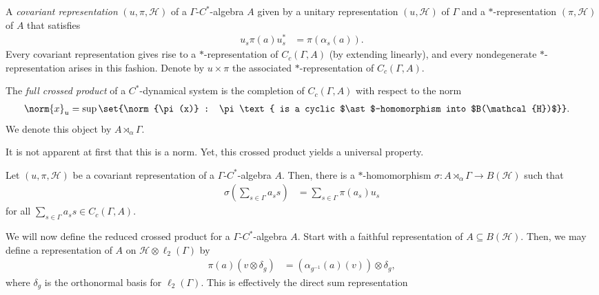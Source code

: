 \documentclass[10pt]{mypackage}
\begin{document}
A \textit{covariant representation} $\left( u,\pi,\mathcal{H} \right)$ of a $\Gamma$-$C^{\ast}$-algebra $A$ given by a unitary representation $\left( u,\mathcal{H} \right)$ of $\Gamma$ and a $\ast$-representation $\left( \pi,\mathcal{H} \right)$ of $A$ that satisfies
\begin{align*}
  u_s\pi\left( a \right)u_s^{\ast} &= \pi\left( \alpha_s(a) \right).
\end{align*}
Every covariant representation gives rise to a $\ast$-representation of $C_c\left( \Gamma,A \right)$ (by extending linearly), and every nondegenerate $\ast$-representation arises in this fashion. Denote by $u\times \pi$ the associated $\ast$-representation of $C_c\left( \Gamma,A \right)$.
\begin{definition}
  The \textit{full crossed product} of a $C^{\ast}$-dynamical system is the completion of $C_c\left( \Gamma,A \right)$ with respect to the norm
  \begin{align*}
    \norm{x}_{u} &= \sup\set{\norm{\pi(x)} : \pi\text{ is a cyclic $\ast$-homomorphism into $B(\mathcal{H})$}}.
  \end{align*}
  We denote this object by $A\rtimes_{\alpha}\Gamma$.
\end{definition}
It is not apparent at first that this is a norm. Yet, this crossed product yields a universal property.
\begin{proposition}
  Let $\left( u,\pi,\mathcal{H} \right)$ be a covariant representation of a $\Gamma$-$C^{\ast}$-algebra $A$. Then, there is a $\ast$-homomorphism $\sigma\colon A\rtimes_{\alpha}\Gamma\rightarrow B\left( \mathcal{H} \right)$ such that
  \begin{align*}
    \sigma\left( \sum_{s\in\Gamma}a_s s \right) &= \sum_{s\in\Gamma}\pi\left( a_s \right)u_s
  \end{align*}
  for all $\sum_{s\in\Gamma}a_s s\in C_c\left( \Gamma,A \right)$.
\end{proposition}
We will now define the reduced crossed product for a $\Gamma$-$C^{\ast}$-algebra $A$. Start with a faithful representation of $A\subseteq B\left( \mathcal{H} \right)$. Then, we may define a representation of $A$ on $\mathcal{H}\otimes \ell_2\left( \Gamma \right)$ by
\begin{align*}
  \pi(a)\left( v\otimes \delta_g \right) &= \left( \alpha_{g^{-1}}\left( a \right)(v) \right)\otimes \delta_g,
\end{align*}
where $\delta_g$ is the orthonormal basis for $\ell_2\left( \Gamma \right)$. This is effectively the direct sum representation
\end{document}
